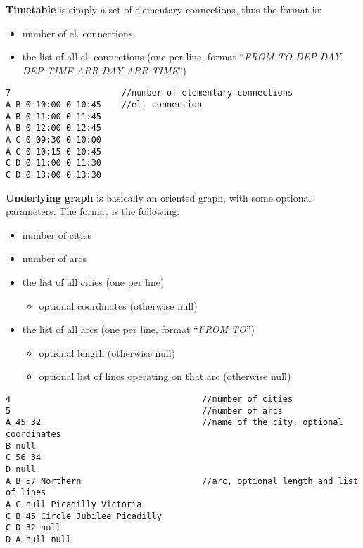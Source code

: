 \noindent \textbf{Timetable} is simply a set of elementary connections, thus the format is:
\begin{itemize}
	\item number of el. connections
	\item the list of all el. connections (one per line, format ``\textit{FROM TO DEP-DAY DEP-TIME ARR-DAY ARR-TIME}'')
\end{itemize}
\hspace*{\fill}

\begin{lstlisting}[caption={TT file format}]
7                      //number of elementary connections
A B 0 10:00 0 10:45    //el. connection
A B 0 11:00 0 11:45
A B 0 12:00 0 12:45
A C 0 09:30 0 10:00
A C 0 10:15 0 10:45
C D 0 11:00 0 11:30
C D 0 13:00 0 13:30
\end{lstlisting}

\noindent \textbf{Underlying graph} is basically an oriented graph, with some optional parameters. The format is the following:
\begin{itemize}
	\item number of cities
	\item number of arcs
	\item the list of all cities  (one per line)
	\begin{itemize}
		\item optional coordinates (otherwise null)
	\end{itemize}
	\item the list of all arcs (one per line, format ``\textit{FROM TO}'')
	\begin{itemize}
		\item optional length (otherwise null)
		\item optional list of lines operating on that arc (otherwise null)
	\end{itemize}
\end{itemize}
\hspace*{\fill}
			
\begin{lstlisting}[caption={UG file format}]
4                                      //number of cities
5                                      //number of arcs
A 45 32                                //name of the city, optional coordinates
B null
C 56 34
D null
A B 57 Northern                        //arc, optional length and list of lines 
A C null Picadilly Victoria            
C B 45 Circle Jubilee Picadilly
C D 32 null                          
D A null null
\end{lstlisting}

